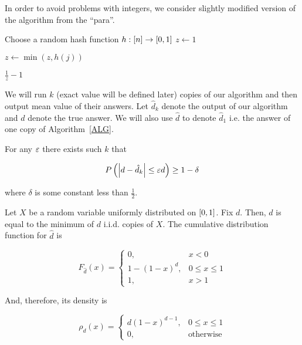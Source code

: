 In order to avoid problems with integers, we consider slightly modified version of the algorithm from the ``para''.

\begin{algorithm}
	\caption{}\label{ALG}
	\begin{algorithmic}[1]
		\State Choose a random hash function $h: \segment{n} \to \segment{0, 1}$
		\State $z \gets 1$
		\EndProcedure

		\State $z \gets \min(z, h(j))$
		\EndProcedure

		\State \Return $\frac{1}{z} - 1$
		\EndProcedure
	\end{algorithmic}
\end{algorithm}

We will run $k$ (exact value will be defined later) copies of our algorithm and then output mean value of their answers. Let $\hat d_k$ denote the output of our algorithm and $d$ denote the true answer. We will also use $\hat d$ to denote $\hat d_1$ i.e. the answer of one copy of Algorithm~\ref{ALG}.

\begin{claim}\label{Main}
	For any $\eps$ there exists such $k$ that

	\begin{equation*}
		\Prob{\abs*{d - \hat d_k} \leq \eps d} \geq 1 - \delta
	\end{equation*}

	where $\delta$ is some constant less than $\frac12$.
\end{claim}

Let $X$ be a random variable uniformly distributed on $\segment{0, 1}$. Fix $d$. Then, $\hat d$ is equal to the minimum of $d$ i.i.d. copies of $X$. The cumulative distribution function for $\hat d$ is

\begin{equation*}
	F_{\hat d}(x) =
	\begin{cases}
		0,             & x < 0           \\
		1 - (1 - x)^d, & 0 \leq x \leq 1 \\
		1,             & x > 1
	\end{cases}
\end{equation*}

And, therefore, its density is

\begin{equation*}
	\rho_{\hat d}(x) =
	\begin{cases}
		d (1 - x)^{d - 1}, & 0 \leq x \leq 1  \\
		0,                 & \text{otherwise}
	\end{cases}
\end{equation*}

